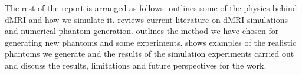 The rest of the report is arranged as follows:  outlines some of the physics behind \acl{dMRI} and how we simulate it.  reviews current literature on \ac{dMRI} simulations and numerical phantom generation.  outlines the method we have chosen for generating new phantoms and some experiments.  shows examples of the realistic phantoms we generate and the results of the simulation experiments carried out and  discuss the results, limitations and future perspectives for the work.


